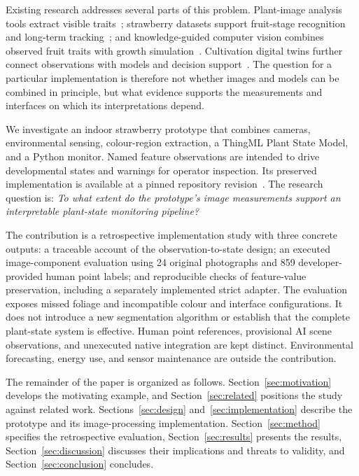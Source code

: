 \documentclass[runningheads]{llncs}
\begin{document}
Existing research addresses several parts of this problem. Plant-image analysis tools extract visible traits~\cite{easlon2014,gehan2017}; strawberry datasets support fruit-stage recognition and long-term tracking~\cite{elhariri2023,wen2024}; and knowledge-guided computer vision combines observed fruit traits with growth simulation~\cite{yang2024}. Cultivation digital twins further connect observations with models and decision support~\cite{janssingh2020,david2023}. The question for a particular implementation is therefore not whether images and models can be combined in principle, but what evidence supports the measurements and interfaces on which its interpretations depend.

We investigate an indoor strawberry prototype that combines cameras, environmental sensing, colour-region extraction, a ThingML Plant State Model, and a Python monitor. Named feature observations are intended to drive developmental states and warnings for operator inspection. Its preserved implementation is available at a pinned repository revision~\cite{autotent}. The research question is: \emph{To what extent do the prototype's image measurements support an interpretable plant-state monitoring pipeline?}

The contribution is a retrospective implementation study with three concrete outputs: a traceable account of the observation-to-state design; an executed image-component evaluation using 24 original photographs and 859 developer-provided human point labels; and reproducible checks of feature-value preservation, including a separately implemented strict adapter. The evaluation exposes missed foliage and incompatible colour and interface configurations. It does not introduce a new segmentation algorithm or establish that the complete plant-state system is effective. Human point references, provisional AI scene observations, and unexecuted native integration are kept distinct. Environmental forecasting, energy use, and sensor maintenance are outside the contribution.

The remainder of the paper is organized as follows. Section~\ref{sec:motivation} develops the motivating example, and Section~\ref{sec:related} positions the study against related work. Sections~\ref{sec:design} and~\ref{sec:implementation} describe the prototype and its image-processing implementation. Section~\ref{sec:method} specifies the retrospective evaluation, Section~\ref{sec:results} presents the results, Section~\ref{sec:discussion} discusses their implications and threats to validity, and Section~\ref{sec:conclusion} concludes.
\end{document}
